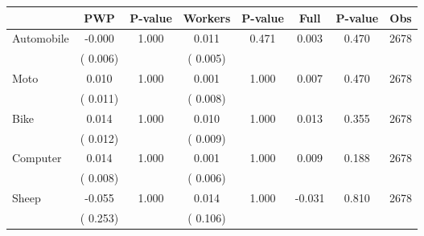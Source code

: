 
\begin{tabular}{l*{7}{c}}\hline&\multicolumn{1}{c}{PWP}&\multicolumn{1}{c}{P-value}&\multicolumn{1}{c}{Workers}&\multicolumn{1}{c}{P-value}&\multicolumn{1}{c}{Full}&\multicolumn{1}{c}{P-value}&\multicolumn{1}{c}{Obs} \\ \hline

 Automobile       &             -0.000       &        1.000  &              0.011       &        0.471  &              0.003       &              0.470 &  2678 \\ 
                       &       (       0.006)             &                               &       (       0.005)                     &                               &                                               &                                &                      \\ 

 Moto       &              0.010       &        1.000  &              0.001       &        1.000  &              0.007       &              0.470 &  2678 \\ 
                       &       (       0.011)             &                               &       (       0.008)                     &                               &                                               &                                &                      \\ 

 Bike       &              0.014       &        1.000  &              0.010       &        1.000  &              0.013       &              0.355 &  2678 \\ 
                       &       (       0.012)             &                               &       (       0.009)                     &                               &                                               &                                &                      \\ 

 Computer       &              0.014       &        1.000  &              0.001       &        1.000  &              0.009       &              0.188 &  2678 \\ 
                       &       (       0.008)             &                               &       (       0.006)                     &                               &                                               &                                &                      \\ 

 Sheep       &             -0.055       &        1.000  &              0.014       &        1.000  &             -0.031       &              0.810 &  2678 \\ 
                       &       (       0.253)             &                               &       (       0.106)                     &                               &                                               &                                &                      \\ 


\end{tabular}
